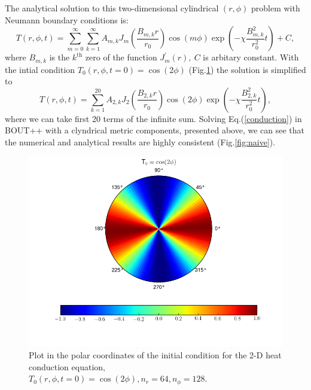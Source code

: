 \documentclass[11pt, oneside]{article}
\begin{document}
The analytical solution to this two-dimensional cylindrical $(r,\phi)$ problem with Neumann boundary conditions is:
\begin{equation}
T\left(r,\phi,t\right) = \sum\limits_{m=0}^{\infty}\sum\limits_{k=1}^{\infty} A_{m,k} J_m\left(\frac{B_{m,k}r}{r_0}\right) \cos\left(m\phi\right) \exp\left( -\chi \frac{B_{m,k}^2}{r_0^2}t\right) + C,
\end{equation}
where $B_{m,k}$ is the $k^{\text{th}}$ zero of the function $J^{'}_m(r), \ C$ is arbitary constant.
With the intial condition $T_0(r,\phi, t = 0) = \cos(2\phi)$ (Fig.\ref{fig1}) the solution is simplified to\cite{ma2015macro}
\begin{equation}
T\left(r,\phi,t\right) = \sum\limits_{k=1}^{20} A_{2,k} J_2\left(\frac{B_{2,k}r}{r_0}\right) \cos\left(2\phi\right) \exp\left( -\chi \frac{B_{2,k}^2}{r_0^2}t\right),
\end{equation}
where we can take first 20 terms of the infinite sum. Solving Eq.(\ref{conduction}) in BOUT++ with a clyndrical metric components, presented above, we can see that the numerical and analytical results are highly consistent (Fig.\ref{fig:naive}).
\begin{figure}
	\centering
	\includegraphics[width=1.\linewidth]{pics/tempBR00000.png}
	\caption{Plot in the polar coordinates of the initial condition for the 2-D heat conduction equation, $T_0(r,\phi, t = 0) = \cos(2\phi), n_r = 64, n_{\phi} = 128.$}
	\label{fig1}
\end{figure}
\end{document}
